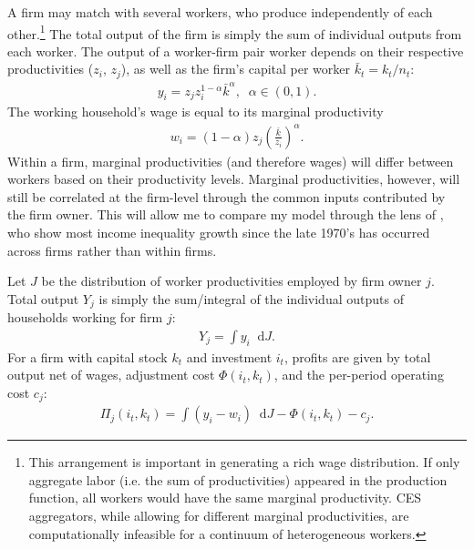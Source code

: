 \documentclass[11pt]{article}
\newcommand*\diff{\mathop{}\!\mathrm{d}}
\theoremstyle{definition}
\numberwithin{equation}{section}
\begin{document}
 A firm may match with several workers, who produce independently of each other.\footnote{This arrangement is important in generating a rich wage distribution. If only aggregate labor (i.e. the sum of productivities) appeared in the production function, all workers would have the same marginal productivity. CES aggregators, while allowing for different marginal productivities, are computationally infeasible for a continuum of heterogeneous workers.} The total output of the firm is simply the sum of individual outputs from each worker. The output of a worker-firm pair worker depends on their respective productivities ($z_i$, $z_j$), as well as the firm's capital per worker $\bar k_t = k_t/n_t$:
\begin{eqnarray}\label{eq:production_decentralized}
y_i = z_j z_i^{1-\alpha} \bar k^\alpha, \;\; \alpha\in(0,1).
\end{eqnarray}
The working household's wage is equal to its marginal productivity
\begin{eqnarray}
w_i= (1-\alpha)z_j\left( \frac{\bar k}{z_i} \right)^{\alpha}.
\end{eqnarray}
Within a firm, marginal productivities (and therefore wages) will differ between workers based on their productivity levels. Marginal productivities, however, will still be correlated at the firm-level through the common inputs contributed by the firm owner. This will allow me to compare my model through the lens of \cite{song2015firming}, who show most income inequality growth since the late 1970's has occurred across firms rather than within firms.


Let $J$ be the distribution of worker productivities employed by firm owner $j$. Total output $Y_j$ is simply the sum/integral of the individual outputs of households working for firm $j$:
\begin{eqnarray}
Y_j = \int y_i \diff J.
\end{eqnarray}
%
For a firm with capital stock $k_t$ and investment $i_t$, profits are given by total output net of wages, adjustment cost $\Phi(i_t, k_t)$, and the per-period operating cost $c_j$: 
\begin{eqnarray}
\Pi_j(i_t, k_t) =  \int \left( y_i - w_i \right) \diff J - \Phi(i_t, k_t) - c_j.  
\end{eqnarray}
\end{document}
